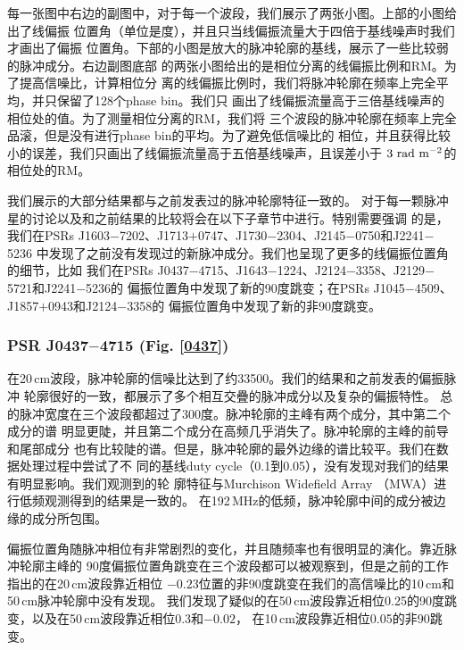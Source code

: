 每一张图中右边的副图中，对于每一个波段，我们展示了两张小图。上部的小图给出了线偏振
位置角（单位是度），并且只当线偏振流量大于四倍于基线噪声时我们才画出了偏振
位置角。下部的小图是放大的脉冲轮廓的基线，展示了一些比较弱的脉冲成分。右边副图底部
的两张小图给出的是相位分离的线偏振比例和RM。为了提高信噪比，计算相位分
离的线偏振比例时，我们将脉冲轮廓在频率上完全平均，并只保留了128个phase bin。我们只
画出了线偏振流量高于三倍基线噪声的相位处的值。为了测量相位分离的RM，我们将
三个波段的脉冲轮廓在频率上完全品滚，但是没有进行phase bin的平均。为了避免低信噪比的
相位，并且获得比较小的误差，我们只画出了线偏振流量高于五倍基线噪声，且误差小于
$3\ \rm{rad\ m^{-2}}$的相位处的RM。

我们展示的大部分结果都与之前发表过的脉冲轮廓特征一致的\supercite{Ord04,Yan11a}。
对于每一颗脉冲星的讨论以及和之前结果的比较将会在以下子章节中进行。特别需要强调
的是，我们在PSRs J1603$-$7202、J1713$+$0747、J1730$-$2304、J2145$-$0750和J2241$-$5236
中发现了之前没有发现过的新脉冲成分。我们也呈现了更多的线偏振位置角的细节，比如
我们在PSRs J0437$-$4715、J1643$-$1224、J2124$-$3358、J2129$-$5721和J2241$-$5236的
偏振位置角中发现了新的90度跳变；在PSRs J1045$-$4509、J1857$+$0943和J2124$-$3358的
偏振位置角中发现了新的非90度跳变。

\subsubsection{PSR J0437$-$4715 (Fig. \ref{0437})}

在20\,cm波段，脉冲轮廓的信噪比达到了约33500。我们的结果和之前发表的偏振脉冲
轮廓很好的一致，都展示了多个相互交疊的脉冲成分以及复杂的偏振特性\supercite{Johnston93,Manchester95a,Navarro97,Yan11a}。
总的脉冲宽度在三个波段都超过了300度。脉冲轮廓的主峰有两个成分，其中第二个成分的谱
明显更陡，并且第二个成分在高频几乎消失了。脉冲轮廓的主峰的前导和尾部成分
也有比较陡的谱。但是，脉冲轮廓的最外边缘的谱比较平。我们在数据处理过程中尝试了不
同的基线duty cycle（0.1到0.05），没有发现对我们的结果有明显影响。我们观测到的轮
廓特征与Murchison Widefield Array （MWA）进行低频观测得到的结果是一致的\supercite{Bhat14}。
在192\,MHz的低频，脉冲轮廓中间的成分被边缘的成分所包围。

偏振位置角随脉冲相位有非常剧烈的变化，并且随频率也有很明显的演化。靠近脉冲轮廓主峰的
90度偏振位置角跳变在三个波段都可以被观察到，但是之前的工作指出的在20\,cm波段靠近相位
$-0.23$位置的非90度跳变在我们的高信噪比的10\,cm和50\,cm脉冲轮廓中没有发现。
我们发现了疑似的在50\,cm波段靠近相位0.25的90度跳变，以及在50\,cm波段靠近相位0.3和$-0.02$，
在10\,cm波段靠近相位0.05的非90跳变。

